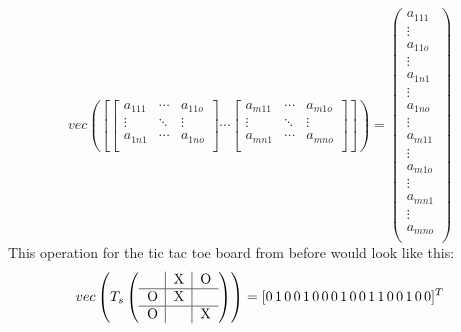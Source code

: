 \documentclass[12pt]{article}
\newcommand{\ticTacToe}[9]{
\begin{tabular}{p{7px}|p{7px}|p{7px}}
  #1 & #2 & #3 \\      \hline
  #4 & #5 & #6 \\      \hline
  #7 & #8 & #9 \\
\end{tabular}
}
\begin{document}
\begin{equation}
vec
\left(\left[ 
\begin{bmatrix}
a_{111} & \cdots & a_{11o} \\
\vdots & \ddots & \vdots \\
a_{1n1} & \cdots & a_{1no} \\
\end{bmatrix}
\cdots
\begin{bmatrix}
a_{m11} & \cdots &  a_{m1o} \\
\vdots   & \ddots & \vdots   \\
a_{mn1} & \cdots & a_{mno}  \\
\end{bmatrix}
\right]\right) = \left(\begin{matrix}
a_{111}      \\
\vdots        \\
a_{11o}      \\
\vdots        \\
a_{1n1}      \\
\vdots        \\
a_{1no}      \\
\vdots        \\
a_{m11}     \\
\vdots        \\
a_{m1o}     \\
\vdots        \\
 a_{mn1}    \\
\vdots        \\
 a_{mno}    \\
\end{matrix}\right)
\end{equation}
This operation for the tic tac toe board from before would look like this:
\begin{equation}
vec\left(T_s\left(\ticTacToe{}{X}{O}{O}{X}{}{O}{}{X}\right)\right) = 
[0\,1\,0\,0\,1\,0\,0\,0\,1\,0 \,0 \,1\,1\,0\,0\,1\,0\,0]^T
\end{equation}
\end{document}
